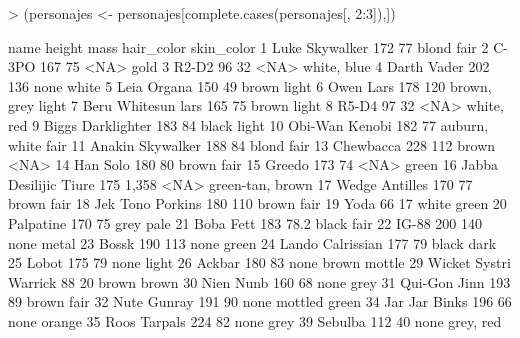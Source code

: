 \documentclass [a4paper] {article}
\begin{document}
\begin{Schunk}
\begin{Sinput}
> (personajes <- personajes[complete.cases(personajes[, 2:3]),])
\end{Sinput}
\begin{Soutput}
                    name height  mass    hair_color          skin_color
1         Luke Skywalker    172    77         blond                fair
2                  C-3PO    167    75          <NA>                gold
3                  R2-D2     96    32          <NA>         white, blue
4            Darth Vader    202   136          none               white
5            Leia Organa    150    49         brown               light
6              Owen Lars    178   120   brown, grey               light
7     Beru Whitesun lars    165    75         brown               light
8                  R5-D4     97    32          <NA>          white, red
9      Biggs Darklighter    183    84         black               light
10        Obi-Wan Kenobi    182    77 auburn, white                fair
11      Anakin Skywalker    188    84         blond                fair
13             Chewbacca    228   112         brown                <NA>
14              Han Solo    180    80         brown                fair
15                Greedo    173    74          <NA>               green
16 Jabba Desilijic Tiure    175 1,358          <NA>    green-tan, brown
17        Wedge Antilles    170    77         brown                fair
18      Jek Tono Porkins    180   110         brown                fair
19                  Yoda     66    17         white               green
20             Palpatine    170    75          grey                pale
21             Boba Fett    183  78.2         black                fair
22                 IG-88    200   140          none               metal
23                 Bossk    190   113          none               green
24      Lando Calrissian    177    79         black                dark
25                 Lobot    175    79          none               light
26                Ackbar    180    83          none        brown mottle
29 Wicket Systri Warrick     88    20         brown               brown
30             Nien Nunb    160    68          none                grey
31          Qui-Gon Jinn    193    89         brown                fair
32           Nute Gunray    191    90          none       mottled green
34         Jar Jar Binks    196    66          none              orange
35          Roos Tarpals    224    82          none                grey
39               Sebulba    112    40          none           grey, red

\end{Soutput}
\end{Schunk}
\end{document}
